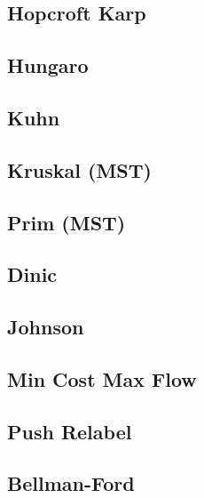 \subsection{Hopcroft Karp}
\raggedbottom
\hrulefill
\subsection{Hungaro}
\raggedbottom
\hrulefill
\subsection{Kuhn}
\raggedbottom
\hrulefill
\subsection{Kruskal (MST)}
\raggedbottom
\hrulefill
\subsection{Prim (MST)}
\raggedbottom
\hrulefill
\subsection{Dinic}
\raggedbottom
\hrulefill
\subsection{Johnson}
\raggedbottom
\hrulefill
\subsection{Min Cost Max Flow}
\raggedbottom
\hrulefill
\subsection{Push Relabel}
\raggedbottom
\hrulefill
\subsection{Bellman-Ford}
\raggedbottom
\hrulefill
